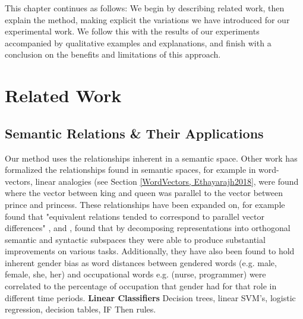 







This chapter continues as follows: We begin by describing related work, then explain the method, making explicit the variations we have introduced for our experimental work. We follow this with the results of our experiments accompanied by qualitative examples and explanations, and finish with a conclusion on the  benefits and limitations of this approach.



\section{Related Work}
\subsection{Semantic Relations \& Their Applications}

Our method uses the relationships inherent in a semantic space. Other work has formalized the relationships found in semantic spaces, for example in word-vectors, linear analogies (see Section \ref{WordVectors, Ethayarajh2018}, were found where the vector between king and queen was parallel to the vector between prince and princess. %
These relationships have been expanded on, for example \cite{TomasMikolovWen-tauYih2013} found that "equivalent relations tended to correspond to parallel vector differences" \cite{Mitchell2015}, and \cite{Mitchell2015}, found that by decomposing representations into orthogonal semantic and syntactic subspaces they were able to produce substantial improvements on various tasks. Additionally, they have also been found to hold inherent gender bias  \cite{Garg2017} as word distances between gendered words (e.g. male, female, she, her) and occupational words e.g. (nurse, programmer) were correlated to the percentage of occupation that gender had for that role in different time periods. %
\textbf{Linear Classifiers}
Decision trees, linear SVM's, logistic regression, decision tables, IF Then rules.

